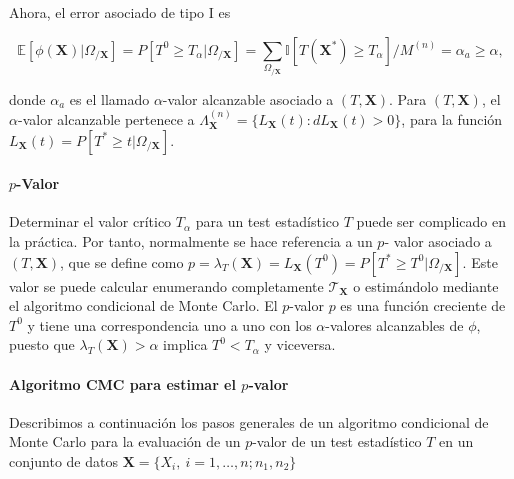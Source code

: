 	Ahora, el error asociado de tipo I es 
	
	\[ 
		\mathbb{E}[ \phi(\mathbf{X}) | \Omega_{/\mathbf{X}}] =
		P[ T^0 \geq T_\alpha | \Omega_{/\mathbf{X}}] =
		\sum\limits_{\Omega_{/\mathbf{X}}}
			\mathbb{I}[ T(\mathbf{X}^*) \geq T_\alpha ]/
				M^{(n)} =
		\alpha_a \geq
		\alpha,
	\] 
	
	donde $\alpha_a$ es el llamado $\alpha$-valor alcanzable 
asociado a $(T, \mathbf{X})$. Para $(T,\mathbf{X})$, el 
$\alpha$-valor alcanzable pertenece a $\Lambda_\mathbf{X}
^{(n)} = \{ L_\mathbf{X}(t): dL_\mathbf{X}(t) > 0 \}$, para 
la función $ L_\mathbf{X}(t) = P[ T^* \geq t | \Omega_{/
\mathbf{X}}] $. 
	
\paragraph{$p$-Valor} Determinar el valor crítico $T_\alpha$ 
para un test estadístico $T$ puede ser complicado en la 
práctica. Por tanto, normalmente se hace referencia a un $p$-
valor asociado a $(T, \mathbf{X})$, que se define como $p = 
\lambda_T(\mathbf{X}) = L_\mathbf{X}(T^0) = P[ T^* \geq T^0 | 
\Omega_{/\mathbf{X}}]$. Este valor se puede calcular 
enumerando completamente $\mathcal{T}_\mathbf{X}$ o 
estimándolo mediante el algoritmo condicional de Monte Carlo. 
El $p$-valor $p$ es una función creciente de $T^0$ y tiene 
una  correspondencia uno a uno con los $\alpha$-valores 
alcanzables de $\phi$, puesto que $\lambda_T(\mathbf{X}) > 
\alpha$ implica $T^0 < T_\alpha$ y viceversa.

\paragraph{Algoritmo CMC para estimar el $p$-valor}  
Describimos a continuación los pasos generales de un 
algoritmo condicional de Monte Carlo para la evaluación de un 
$p$-valor de un test estadístico $T$ en un conjunto de datos 
$\mathbf{X} = \{ X_i, \ i=1, \dots, n; n_1, n_2 \}$

